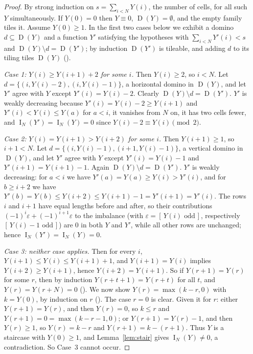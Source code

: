 \documentclass[11pt]{amsart}
\theoremstyle{plain}
\theoremstyle{definition}
\newcommand{\ind}[1]{[\,#1\,]}
\newcommand{\imb}{\operatorname{I}}
\newcommand{\sh}{\operatorname{D}}
\begin{document}
\begin{proof}
By strong induction on $s=\sum_{i<N}Y(i)$, the number of cells, for all such $Y$ simultaneously. If $Y(0)=0$ then $Y\equiv0$, $\sh(Y)=\emptyset$, and the empty family tiles it. Assume $Y(0)\ge1$. In the first two cases below we exhibit a domino $d\subseteq\sh(Y)$ and a function $Y'$ satisfying the hypotheses with $\sum_{i<N}Y'(i)<s$ and $\sh(Y)\setminus d=\sh(Y')$; by induction $\sh(Y')$ is tileable, and adding $d$ to its tiling tiles $\sh(Y)$ ().

\emph{Case 1: $Y(i)\ge Y(i+1)+2$ for some $i$.} Then $Y(i)\ge2$, so $i<N$. Let $d=\{(i,Y(i)-2),(i,Y(i)-1)\}$, a horizontal domino in $\sh(Y)$, and let $Y'$ agree with $Y$ except $Y'(i)=Y(i)-2$. Clearly $\sh(Y)\setminus d=\sh(Y')$. $Y'$ is weakly decreasing because $Y'(i)=Y(i)-2\ge Y(i+1)$ and $Y'(i)<Y(i)\le Y(a)$ for $a<i$, it vanishes from $N$ on, it has two cells fewer, and $\imb_N(Y')=\imb_N(Y)=0$ since $Y(i)-2\equiv Y(i)\pmod 2$.

\emph{Case 2: $Y(i)=Y(i+1)>Y(i+2)$ for some $i$.} Then $Y(i+1)\ge1$, so $i+1<N$. Let $d=\{(i,Y(i)-1),(i+1,Y(i)-1)\}$, a vertical domino in $\sh(Y)$, and let $Y'$ agree with $Y$ except $Y'(i)=Y(i)-1$ and $Y'(i+1)=Y(i+1)-1$. Again $\sh(Y)\setminus d=\sh(Y')$. $Y'$ is weakly decreasing: for $a<i$ we have $Y'(a)=Y(a)\ge Y(i)>Y'(i)$, and for $b\ge i+2$ we have $Y'(b)=Y(b)\le Y(i+2)\le Y(i+1)-1=Y'(i+1)=Y'(i)$. The rows $i$ and $i+1$ have equal lengths before and after, so their contributions $(-1)^i\varepsilon+(-1)^{i+1}\varepsilon$ to the imbalance (with $\varepsilon=\ind{Y(i)\text{ odd}}$, respectively $\ind{Y(i)-1\text{ odd}}$) are $0$ in both $Y$ and $Y'$, while all other rows are unchanged; hence $\imb_N(Y')=\imb_N(Y)=0$.

\emph{Case 3: neither case applies.} Then for every $i$, $Y(i+1)\le Y(i)\le Y(i+1)+1$, and $Y(i+1)=Y(i)$ implies $Y(i+2)\ge Y(i+1)$, hence $Y(i+2)=Y(i+1)$. So if $Y(r+1)=Y(r)$ for some $r$, then by induction $Y(r+t+1)=Y(r+t)$ for all $t$, and $Y(r)=Y(r+N)=0$ (). We now show $Y(r)=\max(k-r,0)$ with $k=Y(0)$, by induction on $r$ (). The case $r=0$ is clear. Given it for $r$: either $Y(r+1)=Y(r)$, and then $Y(r)=0$, so $k\le r$ and $Y(r+1)=0=\max(k-r-1,0)$; or $Y(r+1)=Y(r)-1$, and then $Y(r)\ge1$, so $Y(r)=k-r$ and $Y(r+1)=k-(r+1)$. Thus $Y$ is a staircase with $Y(0)\ge1$, and Lemma~\ref{lem:stair} gives $\imb_N(Y)\ne0$, a contradiction. So Case~3 cannot occur.
\end{proof}
\end{document}
